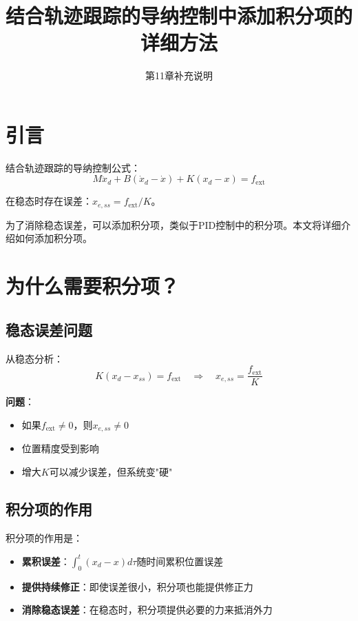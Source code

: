 \documentclass[12pt,a4paper]{article}
\title{结合轨迹跟踪的导纳控制中添加积分项的详细方法}
\author{第11章补充说明}
\date{}
\begin{document}
\maketitle

\section{引言}

结合轨迹跟踪的导纳控制公式：
\begin{equation}
M\ddot{x}_d + B(\dot{x}_d - \dot{x}) + K(x_d - x) = f_{\text{ext}} \tag{*}
\end{equation}

在稳态时存在误差：$x_{e,ss} = f_{\text{ext}}/K$。

为了消除稳态误差，可以添加积分项，类似于PID控制中的积分项。本文将详细介绍如何添加积分项。

\section{为什么需要积分项？}

\subsection{稳态误差问题}

从稳态分析：
\begin{equation}
K(x_d - x_{ss}) = f_{\text{ext}} \quad \Rightarrow \quad x_{e,ss} = \frac{f_{\text{ext}}}{K}
\end{equation}

\textbf{问题}：
\begin{itemize}
\item 如果$f_{\text{ext}} \neq 0$，则$x_{e,ss} \neq 0$
\item 位置精度受到影响
\item 增大$K$可以减少误差，但系统变"硬"
\end{itemize}

\subsection{积分项的作用}

积分项的作用是：
\begin{itemize}
\item \textbf{累积误差}：$\int_0^t (x_d - x) d\tau$随时间累积位置误差
\item \textbf{提供持续修正}：即使误差很小，积分项也能提供修正力
\item \textbf{消除稳态误差}：在稳态时，积分项提供必要的力来抵消外力
\end{itemize}
\end{document}

